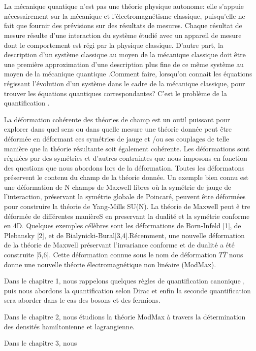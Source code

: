 \documentclass[12pt,a4paper, openany]{report}
\begin{document}
	
	
	\chapter*{\color{green!30!blue}{Introduction}}
	La mécanique quantique n'est pas une théorie physique autonome: elle s'appuie nécessairement sur la mécanique et l'électromagnétisme classique, puisqu'elle ne fait que fournir des prévisions sur des résultats de mesures. Chaque résultat de mesure résulte d'une interaction du système étudié avec un appareil de mesure dont le comportement est régi par la physique classique. D'autre part, la description d'un système classique au moyen de la mécanique classique doit \^{e}tre une première approximation d'une description plus fine de ce m\^{e}me système au moyen de la mécanique quantique .Comment faire, lorsqu'on connait les équations régissant l'évolution d'un système dans le cadre de la mécanique classique, pour trouver  les équations quantiques correspondantes? C'est le problème de la quantification .\par La déformation cohérente des théories de champ est un outil puissant pour explorer dans quel sens ou dans quelle mesure une théorie donnée peut \^{e}tre déformée en déformant ces symétries de jauge  et /ou ses couplages de telle manière que la théorie résultante soit également cohérente. Les déformations sont régulées par des symétries et d'autres contraintes que nous imposons en fonction des questions que nous abordons lors de la déformation. Toutes les déformatons préservent le contenu du champ de la théorie donnée. Un exemple bien connu est une déformation de N champs de Maxwell libres où la symétrie de jauge de l'interaction, préservant la symétrie globale de Poincaré, peuvent \^{e}tre déformées pour construire la théorie de Yang-Mills SU(N). La théorie de Maxwell peut  \^{e} tre déformée de différentes manièreS en preservant la dualité et la symétrie conforme en 4D. Quelques exemples célèbres sont les déformations de Born-Infeld [1], de Plebansky [2], et de Bialynicki-Bural[3,4].Récemment, une nouvelle déformation de la théorie de Maxwell préservant l'invariance conforme et de dualité a été construite [5,6]. Cette déformation connue sous le nom de déformation $T\overline{T}$ nous donne une nouvelle théorie électromagnétique non linéaire (ModMax).\par Dans le chapitre 1, nous rappelons quelques règles de  quantification canonique , puis nous abordons la quantification selon Dirac et enfin la seconde quantification sera aborder dans le cas des bosons et des fermions.\par Dans le chapitre 2, nous étudions la théorie ModMax à travers la détermination  des densités hamiltonienne et lagrangienne.\par Dans le chapitre 3, nous 
\end{document}
